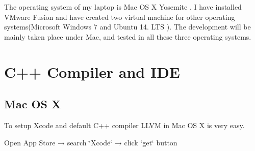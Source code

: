 The operating system of my laptop is Mac O\+S X Yosemite \cite{osxyosemite}. I have installed V\+Mware Fusion \cite{vmwarefusion} and have created two virtual machine for other operating systems(Microsoft Windows 7 \cite{microsoftwindows7} and Ubuntu 14. L\+T\+S \cite{ubuntu14_04LTS}). The development will be mainly taken place under Mac, and tested in all these three operating systems. \hypertarget{_setup_development_environment_SetupDevelopmentEnvironmentCppCompilerandIDE}{}\section{C++ Compiler and I\+D\+E}\label{_setup_development_environment_SetupDevelopmentEnvironmentCppCompilerandIDE}
\hypertarget{_setup_development_environment_SetupDevelopmentEnvironmentCppCompilerandIDEMacOSX}{}\subsection{Mac O\+S X}\label{_setup_development_environment_SetupDevelopmentEnvironmentCppCompilerandIDEMacOSX}
To setup Xcode \cite{xcode} and default C++ compiler L\+L\+V\+M \cite{llvm} in Mac O\+S X is very easy.
\begin{DoxyItemize}
\item Open App Store → search \char`\"{}\+Xcode\char`\"{} → click \char`\"{}get\char`\"{} button
\end{DoxyItemize}

